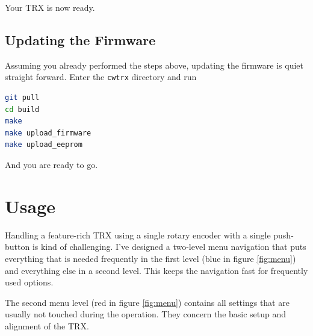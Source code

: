 \documentclass[10pt, a4paper,twoside]{scrartcl}
\begin{document}
Your TRX is now ready.

\subsection{Updating the Firmware}
Assuming you already performed the steps above, updating the firmware is quiet straight forward. Enter the \texttt{cwtrx} directory and run
\begin{lstlisting}[language=bash]
git pull
cd build
make 
make upload_firmware
make upload_eeprom
\end{lstlisting}
And you are ready to go.


\cleardoublepage
\section{Usage} \label{sec:user}
Handling a feature-rich TRX using a single rotary encoder with a single push-button is kind of challenging. I've designed a two-level menu navigation that puts everything that is needed frequently in the first level (blue in figure \ref{fig:menu}) and everything else in a second level. This keeps the navigation fast for frequently used options. 

The second menu level (red in figure \ref{fig:menu}) contains all settings that are usually not touched during the operation. They concern the basic setup and alignment of the TRX. 
\end{document}
